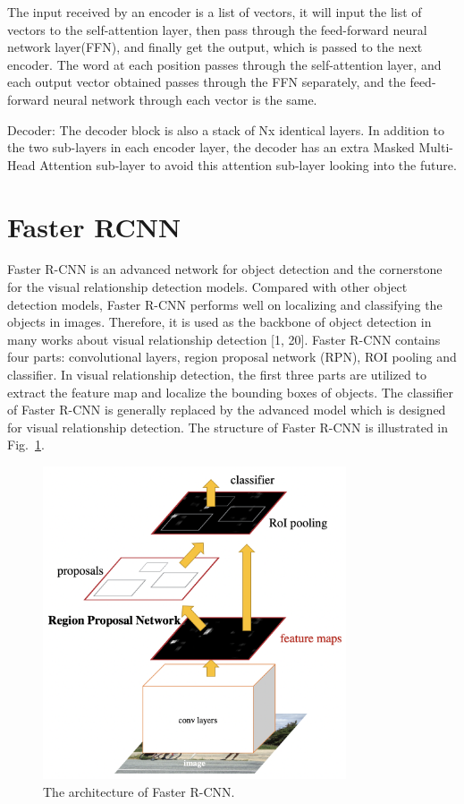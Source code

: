 The input received by an encoder is a list of vectors, it will input the list of vectors to the self-attention layer, then pass through the feed-forward neural network layer(FFN), and finally get the output, which is passed to the next encoder. The word at each position passes through the self-attention layer, and each output vector obtained passes through the FFN separately, and the feed-forward neural network through each vector is the same.


Decoder: The decoder block is also a stack of Nx identical layers. In addition to the two sub-layers in each encoder layer, the decoder has an extra Masked Multi-Head Attention sub-layer to avoid this attention sub-layer looking into the future.


\section{Faster RCNN}

Faster R-CNN is an advanced network for object detection and the cornerstone for the visual relationship detection models. Compared with other object detection models, Faster R-CNN performs well on localizing and classifying the objects in images. Therefore, it is used as the backbone of object detection in many works about visual relationship detection [1, 20]. Faster R-CNN contains four parts: convolutional layers, region proposal network (RPN), ROI pooling and classifier. In visual relationship detection, the first three parts are utilized to extract the feature map and localize the bounding boxes of objects. The classifier of Faster R-CNN is generally replaced by the advanced model which is designed for visual relationship detection. The structure of Faster R-CNN is illustrated in Fig.~\ref{fig:fasterrcnn}.

\begin{figure}[!htbp]
	\centering
	\includegraphics[width = 0.8\textwidth]{figures/fasterrcnn.png}
	\caption[The architecture of Faster R-CNN]
	{ The architecture of Faster R-CNN.}
	\label{fig:fasterrcnn}
\end{figure}

